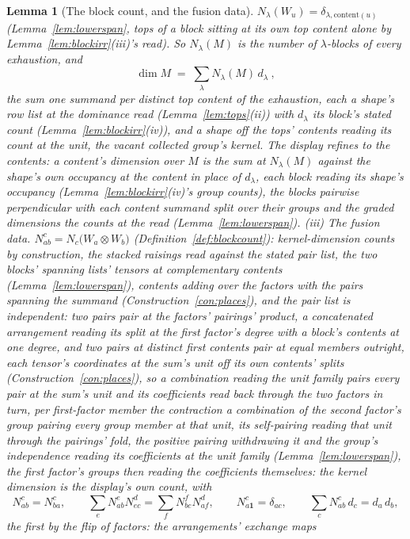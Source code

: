 \documentclass[11pt]{article}
\newtheorem{lemma}{Lemma}
\theoremstyle{definition}
\begin{document}
\begin{lemma}[The block count, and the fusion data]
$N_\lambda(W_u)=\delta_{\lambda,\mathrm{content}(u)}$
(Lemma~\ref{lem:lowerspan}, tops of a block sitting at its own top
content alone by Lemma~\ref{lem:blockirr}(iii)'s read). So
$N_\lambda(M)$ is the number of $\lambda$-blocks of every exhaustion,
and
\[
\dim M\;=\;\sum_\lambda N_\lambda(M)\,d_\lambda\ ,
\]
the sum one summand per distinct top content of the exhaustion,
each a shape's row list at the dominance read
(Lemma~\ref{lem:tops}(ii)) with $d_\lambda$ its block's stated
count (Lemma~\ref{lem:blockirr}(iv)), and a shape off the tops'
contents reading its count at the unit, the vacant collected
group's kernel. The display refines to the contents: a content's
dimension over $M$ is the sum at $N_\lambda(M)$ against the
shape's own occupancy at the content in place of $d_\lambda$,
each block reading its shape's occupancy
(Lemma~\ref{lem:blockirr}(iv)'s group counts), the blocks
pairwise perpendicular with each content summand split over their
groups and the graded dimensions the counts at the read
(Lemma~\ref{lem:lowerspan}).
\emph{(iii) The fusion data.} $N^c_{ab}=N_c\big(W_a\otimes W_b\big)$
(Definition~\ref{def:blockcount}): kernel-dimension counts by
construction, the stacked raisings read against the stated pair
list, the two blocks' spanning lists' tensors at complementary
contents (Lemma~\ref{lem:lowerspan}), contents adding over the
factors with the pairs spanning the summand
(Construction~\ref{con:places}), and the pair list is independent:
two pairs pair at the factors' pairings' product, a concatenated
arrangement reading its split at the first factor's degree with a
block's contents at one degree, and two pairs at distinct first
contents pair at equal members outright, each tensor's coordinates
at the sum's unit off its own contents' splits
(Construction~\ref{con:places}), so a combination reading the unit
family pairs every pair at the sum's unit and its coefficients
read back through the two factors in turn, per first-factor member
the contraction a combination of the second factor's group pairing
every group member at that unit, its self-pairing reading that
unit through the pairings' fold, the positive pairing withdrawing
it and the group's independence reading its coefficients at the
unit family (Lemma~\ref{lem:lowerspan}), the first factor's groups
then reading the coefficients themselves: the kernel dimension is
the display's own count, with
\[
N^c_{ab}=N^c_{ba},\qquad
\sum_eN^e_{ab}N^d_{ec}=\sum_fN^f_{bc}N^d_{af},\qquad
N^c_{a\mathbf 1}=\delta_{ac},\qquad
\sum_cN^c_{ab}\,d_c=d_a\,d_b ,
\]
the first by the flip of factors: the arrangements' exchange maps

\end{lemma}
\end{document}
